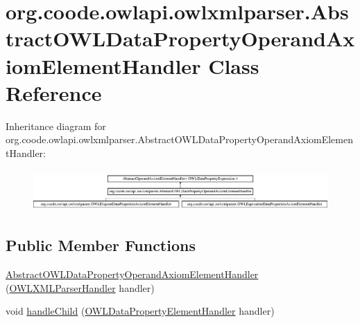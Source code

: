 \hypertarget{classorg_1_1coode_1_1owlapi_1_1owlxmlparser_1_1_abstract_o_w_l_data_property_operand_axiom_element_handler}{\section{org.\-coode.\-owlapi.\-owlxmlparser.\-Abstract\-O\-W\-L\-Data\-Property\-Operand\-Axiom\-Element\-Handler Class Reference}
\label{classorg_1_1coode_1_1owlapi_1_1owlxmlparser_1_1_abstract_o_w_l_data_property_operand_axiom_element_handler}
}
Inheritance diagram for org.\-coode.\-owlapi.\-owlxmlparser.\-Abstract\-O\-W\-L\-Data\-Property\-Operand\-Axiom\-Element\-Handler\-:\begin{figure}[H]
\begin{center}
\leavevmode
\includegraphics[height=1.606119cm]{classorg_1_1coode_1_1owlapi_1_1owlxmlparser_1_1_abstract_o_w_l_data_property_operand_axiom_element_handler}
\end{center}
\end{figure}
\subsection*{Public Member Functions}
\begin{DoxyCompactItemize}
\item 
\hyperlink{classorg_1_1coode_1_1owlapi_1_1owlxmlparser_1_1_abstract_o_w_l_data_property_operand_axiom_element_handler_a1ca05f26be2376152540d9d9bd352cbc}{Abstract\-O\-W\-L\-Data\-Property\-Operand\-Axiom\-Element\-Handler} (\hyperlink{classorg_1_1coode_1_1owlapi_1_1owlxmlparser_1_1_o_w_l_x_m_l_parser_handler}{O\-W\-L\-X\-M\-L\-Parser\-Handler} handler)
\item 
void \hyperlink{classorg_1_1coode_1_1owlapi_1_1owlxmlparser_1_1_abstract_o_w_l_data_property_operand_axiom_element_handler_a6558949a7184624a88e789a530059c3c}{handle\-Child} (\hyperlink{classorg_1_1coode_1_1owlapi_1_1owlxmlparser_1_1_o_w_l_data_property_element_handler}{O\-W\-L\-Data\-Property\-Element\-Handler} handler)
\end{DoxyCompactItemize}


